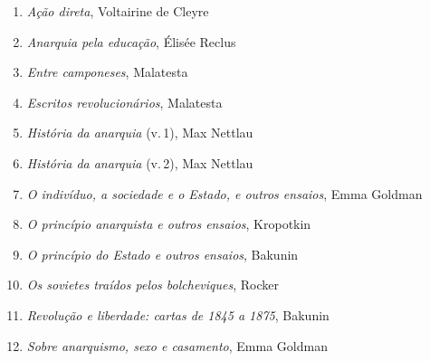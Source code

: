 %




\begin{enumerate}
\setlength{\topsep}{2pt}
\setlength{\partopsep}{0pt}
\setlength\parskip{4.2pt}
\setlength\itemsep{-1.4mm}
\item \textit{Ação direta}, Voltairine de Cleyre
\item \textit{Anarquia pela educação}, Élisée Reclus
\item \textit{Entre camponeses}, Malatesta
\item \textit{Escritos revolucionários}, Malatesta
\item \textit{História da anarquia} (v.\,1), Max Nettlau
\item \textit{História da anarquia} (v.\,2), Max Nettlau
\item \textit{O indivíduo, a sociedade e o Estado, e outros ensaios}, Emma Goldman
\item \textit{O princípio anarquista e outros ensaios}, Kropotkin
\item \textit{O princípio do Estado e outros ensaios}, Bakunin
\item \textit{Os sovietes traídos pelos bolcheviques}, Rocker
\item \textit{Revolução e liberdade: cartas de 1845 a 1875}, Bakunin
\item \textit{Sobre anarquismo, sexo e casamento}, Emma Goldman
\end{enumerate}


%


%



\endgroup %
\nopagecolor
\color{black}